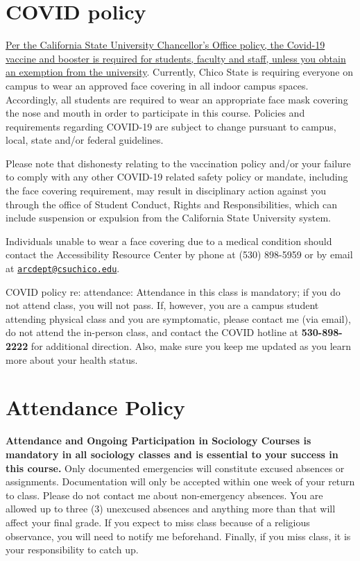 \documentclass[11pt,]{article}
\begin{document}
\hypertarget{covid_policy}{%
\section{COVID policy}\label{covid_policy}}

\href{https://calstate.policystat.com/policy/11030468/latest/}{Per the
California State University Chancellor's Office policy, the Covid-19
vaccine and booster is required for students, faculty and staff, unless
you obtain an exemption from the university}. Currently, Chico State is
requiring everyone on campus to wear an approved face covering in all
indoor campus spaces. Accordingly, all students are required to wear an
appropriate face mask covering the nose and mouth in order to
participate in this course. Policies and requirements regarding COVID-19
are subject to change pursuant to campus, local, state and/or federal
guidelines.

Please note that dishonesty relating to the vaccination policy and/or
your failure to comply with any other COVID-19 related safety policy or
mandate, including the face covering requirement, may result in
disciplinary action against you through the office of Student Conduct,
Rights and Responsibilities, which can include suspension or expulsion
from the California State University system.

Individuals unable to wear a face covering due to a medical condition
should contact the Accessibility Resource Center by phone at (530)
898-5959 or by email at
\href{mailto:arcdept@csuchico.edu}{\nolinkurl{arcdept@csuchico.edu}}.

COVID policy re: attendance: Attendance in this class is mandatory; if
you do not attend class, you will not pass. If, however, you are a
campus student attending physical class and you are symptomatic, please
contact me (via email), do not attend the in-person class, and contact
the COVID hotline at \textbf{530-898-2222} for additional direction.
Also, make sure you keep me updated as you learn more about your health
status.

\hypertarget{attendance}{%
\section{Attendance Policy}\label{attendance}}

\textbf{Attendance and Ongoing Participation in Sociology Courses is
mandatory in all sociology classes and is essential to your success in
this course.} Only documented emergencies will constitute excused
absences or assignments. Documentation will only be accepted within one
week of your return to class. Please do not contact me about
non-emergency absences. You are allowed up to three (3) unexcused
absences and anything more than that will affect your final grade. If
you expect to miss class because of a religious observance, you will
need to notify me beforehand. Finally, if you miss class, it is your
responsibility to catch up.
\end{document}
